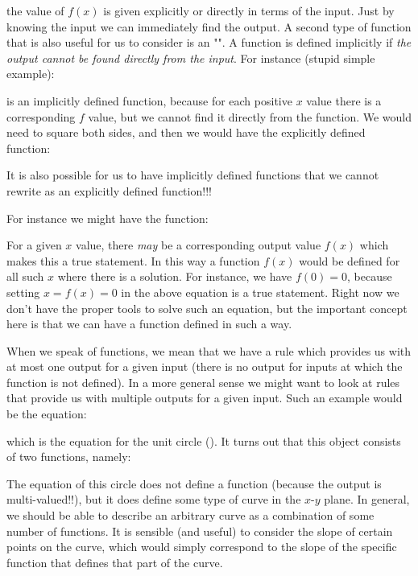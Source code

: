 	the value of $f(x)$ is given explicitly or directly in terms of the input. Just by knowing the input we can immediately find the output. A second type of function that is also useful for us to consider is an "". A function is defined implicitly if {\it the output cannot be found directly from the input}. For instance (stupid simple example):
	
	 is an implicitly defined function, because for each positive $x$ value there is a corresponding $f$ value, but we cannot find it directly from the function. We would need to square both sides, and then we would have the explicitly defined function:
	 	
	It is also possible for us to have implicitly defined functions that we cannot rewrite as an explicitly defined function!!! 
	
	For instance we might have the function:
	
	For a given $x$ value, there {\it may} be a corresponding output value $f(x)$ which makes this a true statement. In this way a function $f(x)$ would be defined for all such $x$ where there is a solution. For instance, we have $f(0) = 0$, because setting $x=f(x)=0$ in the above equation is a true statement. Right now we don't have the proper tools to solve such an equation, but the important concept here is that we can have a function defined in such a way. 
	
	When we speak of functions, we mean that we have a rule which provides us with at most one output for a given input (there is no output for inputs at which the function is not defined). In a more general sense we might want to look at rules that provide us with multiple outputs for a given input. Such an example would be the equation:
	
	which is the equation for the unit circle (). It turns out that this object consists of two functions, namely:
	
	The equation of this circle does not define a function (because the output is multi-valued!!), but it does define some type of curve in the $x$-$y$ plane. In general, we should be able to describe an arbitrary curve as a combination of some number of functions. It is sensible (and useful) to consider the slope of certain points on the curve, which would simply correspond to the slope of the specific function that defines that part of the curve. 
	
